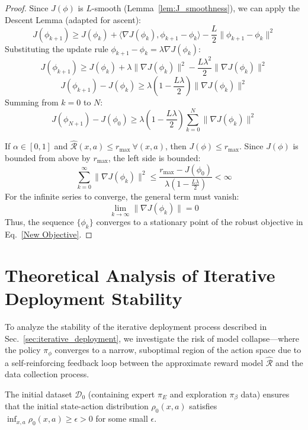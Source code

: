 \documentclass[./dissertation.tex]{subfiles}
\begin{document}
\begin{proof}
Since $J(\phi)$ is $L$-smooth (Lemma~\ref{lem:J_smoothness}), we can apply the Descent Lemma (adapted for ascent):
\[ J(\phi_{k+1}) \geq J(\phi_k) + \langle \nabla J(\phi_k), \phi_{k+1} - \phi_k \rangle - \frac{L}{2} \|\phi_{k+1} - \phi_k\|^2 \]
Substituting the update rule $\phi_{k+1} - \phi_k = \lambda \nabla J(\phi_k)$:
\[ J(\phi_{k+1}) \geq J(\phi_k) + \lambda \|\nabla J(\phi_k)\|^2 - \frac{L\lambda^2}{2} \|\nabla J(\phi_k)\|^2 \]
\[ J(\phi_{k+1}) - J(\phi_k) \geq \lambda \left( 1 - \frac{L\lambda}{2} \right) \|\nabla J(\phi_k)\|^2 \]
Summing from $k=0$ to $N$:
\[ J(\phi_{N+1}) - J(\phi_0) \geq \lambda \left( 1 - \frac{L\lambda}{2} \right) \sum_{k=0}^{N} \|\nabla J(\phi_k)\|^2 \]

If $\alpha\in[0,1]$ and $\hat{\mathcal{R}}(x,a)\le r_{\max}~\forall (x,a)$, then $J(\phi) \leq r_{\text{max}}$.
Since $J(\phi)$ is bounded from above by $r_\text{max}$, the left side is bounded:
\[ \sum_{k=0}^{\infty} \|\nabla J(\phi_k)\|^2 \leq \frac{r_\text{max} - J(\phi_0)}{\lambda (1 - \frac{L\lambda}{2})} < \infty \]
For the infinite series to converge, the general term must vanish:
\[ \lim_{k \to \infty} \|\nabla J(\phi_k)\| = 0 \]
Thus, the sequence $\{\phi_k\}$ converges to a stationary point of the robust objective in Eq.~\ref{New Objective}.
\end{proof}

\chapter{Theoretical Analysis of Iterative Deployment Stability}
\label{sec:iterative_stability}

To analyze the stability of the iterative deployment process described in Sec.~\ref{sec:iterative_deployment}, we investigate the risk of model collapse—where the policy $\pi_\phi$ converges to a narrow, suboptimal region of the action space due to a self-reinforcing feedback loop between the approximate reward model $\hat{\mathcal{R}}$ and the data collection process.

\begin{assumption}
\label{asm:distribution_coverage}
The initial dataset $\mathcal{D}_0$ (containing expert $\pi_E$ and exploration $\pi_\beta$ data) ensures that the initial state-action distribution $\rho_0(x, a)$ satisfies $\inf_{x, a} \rho_0(x, a) \geq \epsilon > 0$ for some small $\epsilon$.
\end{assumption}
\end{document}
